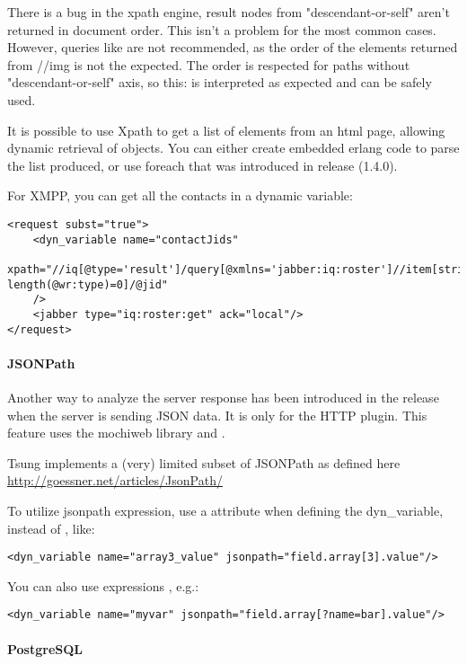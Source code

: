 \documentclass{TSUNG-en}
\begin{document}
There is a bug in the xpath engine, result nodes from "descendant-or-self" aren't returned in document order. This isn't a problem for the most common cases.
However, queries like  are not recommended, as the order of the  elements returned from //img is not the expected.
The order is respected for paths without "descendant-or-self" axis, so this:  is interpreted as expected and can be safely used.


It is possible to use Xpath to get a list of elements from an html page, allowing dynamic retrieval of objects. You can either create embedded erlang code to parse the list produced, or use foreach that was introduced in release \strong(1.4.0).

For XMPP, you can get all the contacts in a dynamic variable:
\begin{Verbatim}
<request subst="true">
    <dyn_variable name="contactJids"
      xpath="//iq[@type='result']/query[@xmlns='jabber:iq:roster']//item[string-length(@wr:type)=0]/@jid"
    />
    <jabber type="iq:roster:get" ack="local"/>
</request>
\end{Verbatim}

\paragraph{JSONPath}
\label{sec:jsonpath}

Another way to analyze the server response has been introduced in the
release  when the server is sending JSON data. It is only for the HTTP plugin. This feature uses the mochiweb library
and .

Tsung implements a (very) limited subset of JSONPath as defined here \url{http://goessner.net/articles/JsonPath/}

To utilize jsonpath expression, use a  attribute when
defining the dyn\_variable, instead of , like:
\begin{Verbatim}
<dyn_variable name="array3_value" jsonpath="field.array[3].value"/>
\end{Verbatim}

You can also use expressions , e.g.:
\begin{Verbatim}
<dyn_variable name="myvar" jsonpath="field.array[?name=bar].value"/>
\end{Verbatim}

\paragraph{PostgreSQL}
\end{document}
